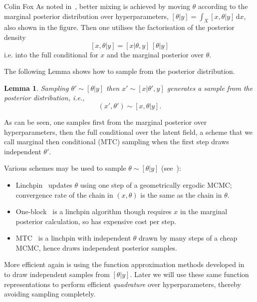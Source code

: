 \documentclass{owrart}
\theoremstyle{plain}
\newtheorem{lemma}{Lemma}
\newcommand{\dd}{\mathrm{d}}
\begin{document}
\begin{talk}{Colin Fox}
As noted in~\cite{RueHeld,fox2016fast}, better mixing is achieved by moving $\theta$ according to the marginal posterior distribution over hyperparameters, $[\theta|y]=\int_X [x,\theta|y]\,\dd x$, also shown in the figure. Then one utilises the factorisation of the posterior density
\[ [x,\theta|y] = [x|\theta,y]\,[\theta|y] \]
i.e. into the full conditional for $x$ and the marginal posterior over $\theta$.

The following Lemma shows how to sample from the posterior distribution.
\begin{lemma}
Sampling $\theta'\sim [\theta|y]$ then $x'\sim [x|\theta',y]$
generates a sample from the posterior distribution, i.e.,
\[ \left(x' ,\theta'\right) \sim [x,\theta|y]. \]
\end{lemma}
\noindent
As can be seen, one samples first from the marginal posterior over hyperparameters, then the full conditional over the latent field, a scheme that we call marginal then conditional (MTC) sampling when the first step draws independent $\theta'$.

Various schemes may be used to sample $\theta \sim [\theta|y]$ (see~\cite{fox2016fast}):
\begin{itemize}
 \item Linchpin~\cite{AcostaHuberJones} updates $\theta$ using one step of a  geometrically ergodic MCMC; convergence rate of the chain in $\left(x ,\theta\right)$ is the same as the chain in $\theta$.
 \item One-block~\cite{RueHeld} is a linchpin algorithm though requires $x$ in the marginal posterior calculation, so has expensive cost per step.
 \item MTC~\cite{fox2016fast} is a linchpin with independent $\theta$ drawn by many steps of a cheap MCMC, hence draws independent posterior samples.
\end{itemize}
More efficient again is using the function approximation methods developed in~\cite{dolgov2020approximation} to draw independent samples from $[\theta|y]$. Later we will use these same function representations to perform efficient  \emph{quadrature} over hyperparameters, thereby avoiding sampling completely.


\end{talk}
\end{document}
